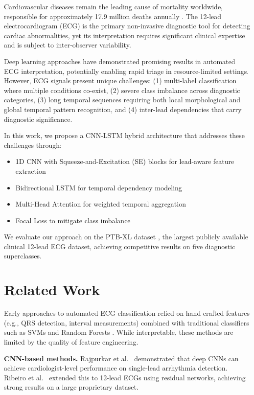 \documentclass[conference]{IEEEtran}
\begin{document}
Cardiovascular diseases remain the leading cause of mortality worldwide, responsible for approximately 17.9 million deaths annually \cite{who2021}. The 12-lead electrocardiogram (ECG) is the primary non-invasive diagnostic tool for detecting cardiac abnormalities, yet its interpretation requires significant clinical expertise and is subject to inter-observer variability.

Deep learning approaches have demonstrated promising results in automated ECG interpretation, potentially enabling rapid triage in resource-limited settings. However, ECG signals present unique challenges: (1) multi-label classification where multiple conditions co-exist, (2) severe class imbalance across diagnostic categories, (3) long temporal sequences requiring both local morphological and global temporal pattern recognition, and (4) inter-lead dependencies that carry diagnostic significance.

In this work, we propose a CNN-LSTM hybrid architecture that addresses these challenges through:
\begin{itemize}
    \item 1D CNN with Squeeze-and-Excitation (SE) blocks for lead-aware feature extraction
    \item Bidirectional LSTM for temporal dependency modeling
    \item Multi-Head Attention for weighted temporal aggregation
    \item Focal Loss to mitigate class imbalance
\end{itemize}

We evaluate our approach on the PTB-XL dataset \cite{wagner2020ptbxl}, the largest publicly available clinical 12-lead ECG dataset, achieving competitive results on five diagnostic superclasses.

\section{Related Work}

Early approaches to automated ECG classification relied on hand-crafted features (e.g., QRS detection, interval measurements) combined with traditional classifiers such as SVMs and Random Forests \cite{luz2016ecg}. While interpretable, these methods are limited by the quality of feature engineering.

\textbf{CNN-based methods.} Rajpurkar et al.\ \cite{rajpurkar2017cardiologist} demonstrated that deep CNNs can achieve cardiologist-level performance on single-lead arrhythmia detection. Ribeiro et al.\ \cite{ribeiro2020automatic} extended this to 12-lead ECGs using residual networks, achieving strong results on a large proprietary dataset.
\end{document}
